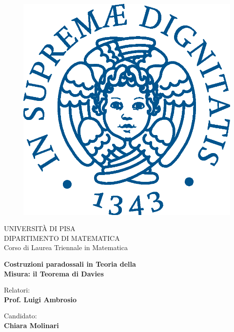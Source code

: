 \begin{titlepage}
\begin{figure}[!htb]
    \centering
    \includegraphics[keepaspectratio=true,scale=0.5]{cherubino_pant541.eps}
\end{figure}

\begin{center}
    \LARGE{UNIVERSITÀ DI PISA}
    \vspace{5mm}
    \\ \large{DIPARTIMENTO DI MATEMATICA}
    \vspace{5mm}
    \\ \LARGE{Corso di Laurea Triennale in Matematica}
\end{center}

\vspace{15mm}
\begin{center}
    {\LARGE{\bf Costruzioni paradossali in Teoria della\\\vspace{5mm}Misura: il Teorema di Davies}}
\end{center}
\vspace{30mm}

\begin{minipage}[t]{0.47\textwidth}
	{\large{Relatori:}{\normalsize\vspace{3mm}
	\bf\\ \large{Prof. Luigi Ambrosio}}}
\end{minipage}
\hfill
\begin{minipage}[t]{0.47\textwidth}\raggedleft
	{\large{Candidato:}{\normalsize\vspace{3mm} \bf\\ \large{Chiara Molinari\\ }}}
\end{minipage}

\vspace{30mm}
\hrulefill
\\

\end{titlepage}